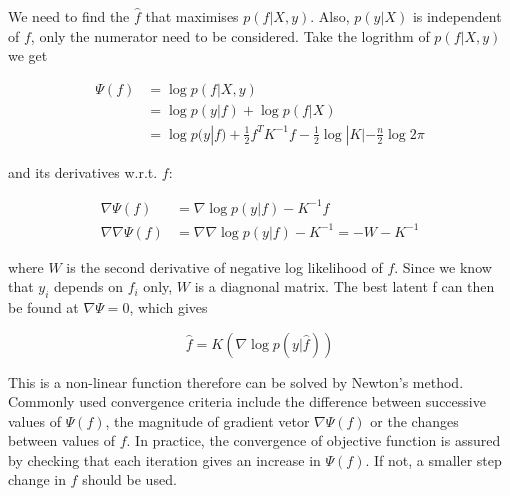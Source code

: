 \documentclass[14pt]{report}
\numberwithin{equation}{chapter}
\begin{document}
\begin{spacing}{2}
We need to find the $\hat{f}$ that maximises $p(f|X,y)$. Also, $p(y|X)$ is independent of $f$, only the numerator need to be considered. Take the logrithm of $p(f|X,y)$ we get

\begin{equation}
\begin{split}
\Psi(f) & = \operatorname{log}p(f|X,y) \\
& = \operatorname{log}p(y|f) + \operatorname{log}p(f|X) \\
& = \operatorname{log}p(y|f) + \frac{1}{2}f^TK^{-1}f - \frac{1}{2}\operatorname{log}|K| - \frac{n}{2}\operatorname{log}2\pi
\end{split}
\end{equation}

and its derivatives w.r.t. $f$:

\begin{align}
\nabla\Psi(f) & = \nabla\operatorname{log}p(y|f) - K^{-1}f \\
\nabla\nabla\Psi(f) & = \nabla\nabla\operatorname{log}p(y|f) - K^{-1} = -W - K^{-1}
\end{align}

where $W$ is the second derivative of negative log likelihood of $f$. Since we know that $y_i$ depends on $f_i$ only, $W$ is a diagnonal matrix. The best latent f can then be found at $\nabla\Psi = 0$, which gives 

\begin{equation}
\label{optimised_f}
\hat{f} = K(\nabla \operatorname{log}p(y|\hat{f}))
\end{equation}

This is a non-linear function therefore can be solved by Newton's method. Commonly used convergence criteria include the difference between successive values of $\Psi (f)$, the magnitude of gradient vetor $\nabla\Psi (f)$ or the changes between values of $f$. In practice, the convergence of objective function is assured by checking that each iteration gives an increase in $\Psi (f)$. If not, a smaller step change in $f$ should be used. 


\end{spacing}
\end{document}
